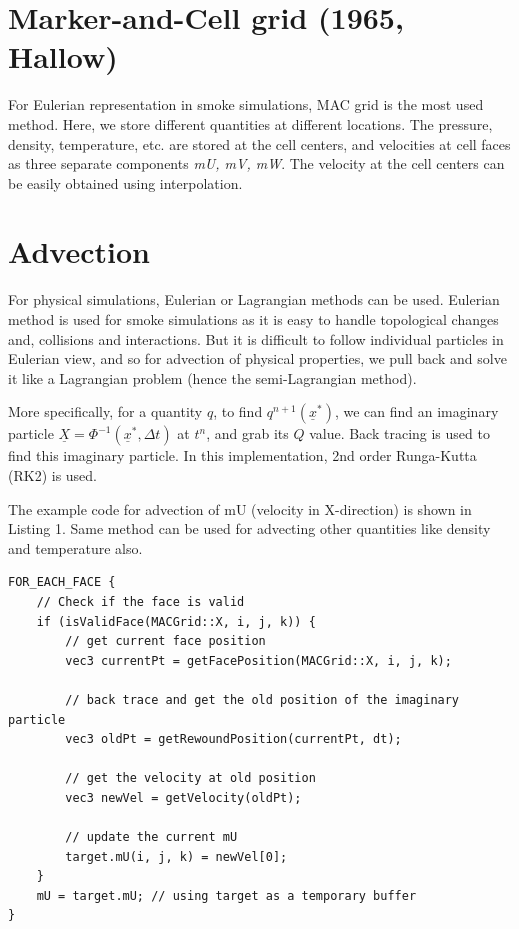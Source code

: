 \documentclass[a4paper,11pt]{article}
\theoremstyle{mytheor}
\begin{document}
\section*{Marker-and-Cell grid (1965, Hallow)}

For Eulerian representation in smoke simulations, MAC grid is the most used method. Here, we store different quantities at different locations. The pressure, density, temperature, etc. are stored at the cell centers, and velocities at cell faces as three separate components \textit{mU, mV, mW}. The velocity at the cell centers can be easily obtained using interpolation.



\section*{Advection}

For physical simulations, Eulerian or Lagrangian methods can be used. Eulerian method is used for smoke simulations as it is easy to handle topological changes and, collisions and interactions. But it is difficult to follow individual particles in Eulerian view, and so for advection of physical properties, we pull back and solve it like a Lagrangian problem (hence the semi-Lagrangian method). 

\par
\noindent
More specifically, for a quantity $q$, to find ${q^{n+1}(\underline{x}^*)}$, we can find an imaginary particle ${\underline{X}=\Phi^{-1}(\underline{x}^*,\Delta t)}$ at $t^n$, and grab its $Q$ value. Back tracing is used to find this imaginary particle. In this implementation, 2nd order Runga-Kutta (RK2) is used.

\par
\noindent
The example code for advection of mU (velocity in X-direction) is shown in Listing 1. Same method can be used for advecting other quantities like density and temperature also.

\begin{lstlisting}[label={list:first},caption=Sample Advection code -- Advecting velocities in X-direction i.e. mU]
FOR_EACH_FACE {
    // Check if the face is valid
    if (isValidFace(MACGrid::X, i, j, k)) { 
        // get current face position
        vec3 currentPt = getFacePosition(MACGrid::X, i, j, k); 
        
        // back trace and get the old position of the imaginary particle 
        vec3 oldPt = getRewoundPosition(currentPt, dt);
        
        // get the velocity at old position
        vec3 newVel = getVelocity(oldPt);
        
        // update the current mU
        target.mU(i, j, k) = newVel[0]; 
    }
    mU = target.mU; // using target as a temporary buffer
}
\end{lstlisting}
\end{document}
